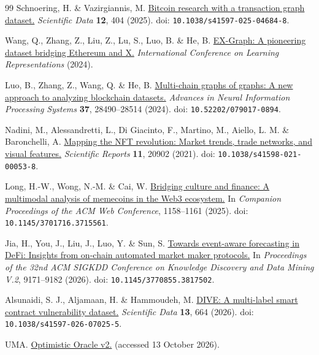 \begin{thebibliography}{99}
Schnoering, H. \& Vazirgiannis, M.
\href{https://doi.org/10.1038/s41597-025-04684-8}{Bitcoin research with a transaction graph dataset.}
\emph{Scientific Data} \textbf{12}, 404 (2025).
doi: \nolinkurl{10.1038/s41597-025-04684-8}.

Wang, Q., Zhang, Z., Liu, Z., Lu, S., Luo, B. \& He, B.
\href{https://openreview.net/forum?id=juE0rWGCJW}{EX-Graph: A pioneering dataset bridging Ethereum and X.}
\emph{International Conference on Learning Representations} (2024).


Luo, B., Zhang, Z., Wang, Q. \& He, B.
\href{https://doi.org/10.52202/079017-0894}{Multi-chain graphs of graphs: A new approach to analyzing blockchain datasets.}
\emph{Advances in Neural Information Processing \linebreak Systems} \textbf{37}, 28490--28514 (2024).
doi: \nolinkurl{10.52202/079017-0894}.

Nadini, M., Alessandretti, L., Di Giacinto, F., Martino, M., Aiello, L. M. \& Baronchelli, A.
\href{https://doi.org/10.1038/s41598-021-00053-8}{Mapping the NFT revolution: Market trends, trade networks, and visual features.}
\linebreak
\emph{Scientific Reports} \textbf{11}, 20902 (2021).
doi: \nolinkurl{10.1038/s41598-021-00053-8}.

Long, H.-W., Wong, N.-M. \& Cai, W.
\href{https://doi.org/10.1145/3701716.3715561}{Bridging culture and finance: A multimodal analysis of memecoins in the Web3 ecosystem.}
In \emph{Companion Proceedings of the ACM Web Conference}, 1158--1161 (2025).
doi: \nolinkurl{10.1145/3701716.3715561}.

Jia, H., You, J., Liu, J., Luo, Y. \& Sun, S.
\href{https://doi.org/10.1145/3770855.3817502}{Towards event-aware forecasting in DeFi: Insights from on-chain automated market maker protocols.}
In \emph{Proceedings of the 32nd ACM SIGKDD Conference on Knowledge Discovery and Data Mining V.2}, 9171--9182 (2026).
doi: \nolinkurl{10.1145/3770855.3817502}.

Alsunaidi, S. J., Aljamaan, H. \& Hammoudeh, M.
\href{https://doi.org/10.1038/s41597-026-07025-5}{DIVE: A multi-label smart contract vulnerability dataset.}
\emph{Scientific Data} \textbf{13}, 664 (2026).
doi: \nolinkurl{10.1038/s41597-026-07025-5}.

UMA.
\href{https://docs.uma.xyz/developers/optimistic-oracle}{Optimistic Oracle v2.}
(accessed 13 October 2026).


\end{thebibliography}
